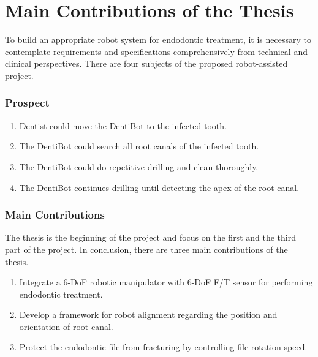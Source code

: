 \section{Main Contributions of the Thesis}
\label{sec:contributions}
\hspace*{6mm}To build an appropriate robot system for endodontic treatment, it is necessary to contemplate requirements and specifications comprehensively from technical and clinical perspectives. There are four subjects of the proposed robot-assisted project. 
\subsubsection{Prospect}
\begin{enumerate}
	\item Dentist could move the DentiBot to the infected tooth. 
	\item The DentiBot could search all root canals of the infected tooth.
	\item The DentiBot could do repetitive drilling and clean thoroughly.
	\item The DentiBot continues drilling until detecting the apex of the root canal.
\end{enumerate}	
\subsubsection{Main Contributions}
\hspace*{6mm}The thesis is the beginning of the project and focus on the first and the third part of the project. In conclusion, there are three main contributions of the thesis.
\begin{enumerate}
	\item	Integrate a 6-DoF robotic manipulator with 6-DoF F/T sensor for performing endodontic treatment.
	\item	Develop a framework for robot alignment regarding the position and orientation of root canal. 
	\item	Protect the endodontic file from fracturing by controlling file rotation speed.
\end{enumerate}
\newpage
